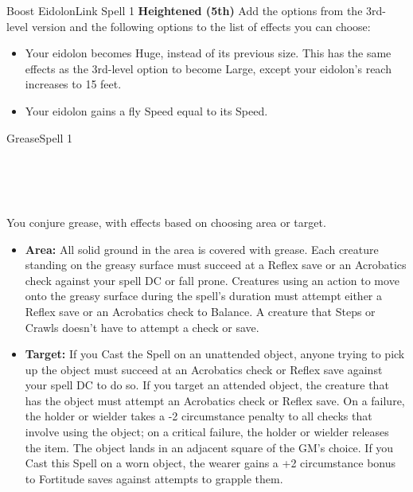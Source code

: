 \documentclass[12pt,openany,twocolumn]{book}
\begin{document}
\begin{spell}{Boost Eidolon}{}{Link Spell 1}
    \indent\textbf{Heightened (5th)} Add the options from the 3rd-level version and the following options to the list of effects you can choose: 
    \begin{itemize}
        \item Your eidolon becomes Huge, instead of its previous size. This has the same effects as the 3rd-level option to become Large, except your eidolon's reach increases to 15 feet.
        \item Your eidolon gains a fly Speed equal to its Speed.
    \end{itemize}

\end{spell}

\begin{spell}{Grease}{}{Spell 1}
    \begin{spellinfo}
         \\
         \\
         \\
    \end{spellinfo}

    \begin{spellbody}
        You conjure grease, with effects based on choosing area or target.
        \begin{itemize}
            \item \textbf{Area:} All solid ground in the area is covered with grease. Each creature standing on the greasy surface must succeed at a Reflex save or an Acrobatics check against your spell DC or fall prone. Creatures using an action to move onto the greasy surface during the spell's duration must attempt either a Reflex save or an Acrobatics check to Balance. A creature that Steps or Crawls doesn't have to attempt a check or save.

            \item \textbf{Target:} If you Cast the Spell on an unattended object, anyone trying to pick up the object must succeed at an Acrobatics check or Reflex save against your spell DC to do so. If you target an attended object, the creature that has the object must attempt an Acrobatics check or Reflex save. On a failure, the holder or wielder takes a -2 circumstance penalty to all checks that involve using the object; on a critical failure, the holder or wielder releases the item. The object lands in an adjacent square of the GM's choice. If you Cast this Spell on a worn object, the wearer gains a +2 circumstance bonus to Fortitude saves against attempts to grapple them.
        \end{itemize}
    \end{spellbody}

    \indent{}
\end{spell}
\end{document}

